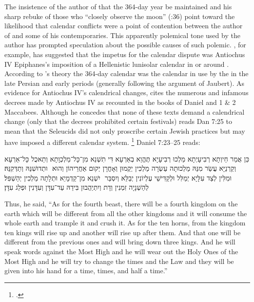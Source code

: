 The insistence of the author of \jub that the 364-day year be maintained and his sharp rebuke of those who ``closely observe the moon'' (:36) point toward the likelihood that calendar conflicts were a point of contention between the author of \jub and some of his contemporaries.%
    \autocite{fraade_dine-israel2010}
This apparently polemical tone used by the author has prompted speculation about the possible causes of such polemic. \vanderkam, for example, has suggested that the impetus for the calendar dispute was Antiochus IV Epiphanes's imposition of a Hellenistic lunisolar calendar in or around . According to \vanderkam's theory the 364-day calendar was the calendar in use by the \jerusalemtemple in the late Persian and early \secondtemple periods (generally following the argument of Jaubert). As evidence for Antiochus IV's calendrical changes, \vanderkam cites the numerous and infamous decrees made by Antiochus IV as recounted in the books of Daniel and 1 \& 2 Maccabees. Although he concedes that none of these texts demand a calendrical change (only that the decrees prohibited certain festivals) \vanderkam reads Dan 7:25 to mean that the Seleucids did not only proscribe certain Jewish practices but may have imposed a different calendar system.%
    \footnote{%
        \Cite[59--60; 68--69]{vanderkam_jsj1981}.}
Daniel 7:23--25 reads:

\begin{aramaictext}
    ‏כֵּן אֲמַר חֵיוְתָא רְבִיעָיְתָא מַלְכוּ רְבִיעָיָא תֶּהֱוֵא בְאַרְעָא דִּי תִשְׁנֵא מִן־כָּל־מַלְכְוָתָא וְתֵאכֻל כָּל־אַרְעָא וּתְדוּשִׁנַּהּ וְתַדְּקִנַּהּ׃ ‎
    ‏ וְקַרְנַיָּא עֲשַׂר מִנַּהּ מַלְכוּתָה עַשְׂרָה מַלְכִין יְקֻמוּן וְאָחֳרָן יְקוּם אַחֲרֵיהוֹן וְהוּא יִשְׁנֵא מִן־קַדְמָיֵא וּתְלָתָה מַלְכִין יְהַשְׁפִּל׃ ‎
    ‏ וּמִלִּין לְצַד עִלָּיָא יְמַלִּל וּלְקַדִּישֵׁי עֶלְיוֹנִין יְבַלֵּא וְיִסְבַּר לְהַשְׁנָיָה זִמְנִין וְדָת וְיִתְיַהֲבוּן בִּידֵהּ עַד־עִדָּן וְעִדָּנִין וּפְלַג עִדָּן׃
\end{aramaictext}

\begin{translation}
    Thus, he said, ``As for the fourth beast, there will be a fourth kingdom on the earth which will be different from all the other kingdoms and it will consume the whole earth and trample it and crush it.
    As for the ten horns, from the kingdom ten kings will rise up and another will rise up after them. And that one will be different from the previous ones and will bring down three kings.
    And he will speak words against the Most High and he will wear out the Holy Ones of the Most High and he will try to change the times and the Law and they will be given into his hand for a time, times, and half a time.''
\end{translation}

